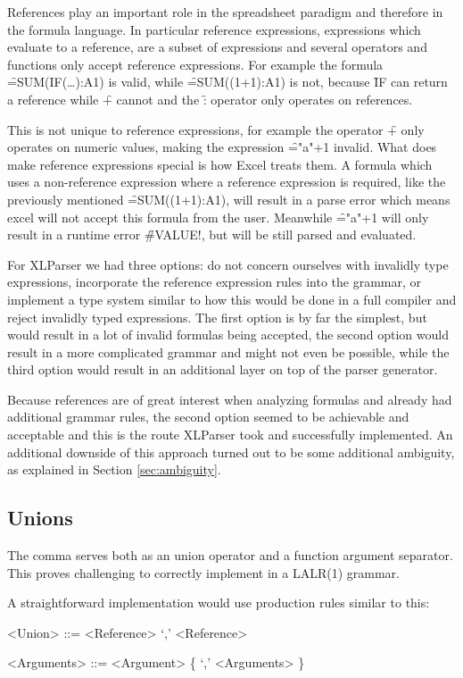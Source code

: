 References play an important role in the spreadsheet paradigm and therefore in the formula language.
In particular reference expressions, expressions which evaluate to a reference, are a subset of expressions and several operators and functions only accept reference expressions.
For example the formula \f{=SUM(IF(\ldots):A1)} is valid, while \f{=SUM((1+1):A1)} is not, because \f{IF} can return a reference while \f{+} cannot and the \f{:} operator only operates on references.

This is not unique to reference expressions, for example the operator \f{+} only operates on numeric values, making the expression \f{="a"+1} invalid.
What does make reference expressions special is how Excel treats them.
A formula which uses a non-reference expression where a reference expression is required, like the previously mentioned \f{=SUM((1+1):A1)}, will result in a parse error which means excel will not accept this formula from the user.
Meanwhile \f{="a"+1} will only result in a runtime error \f{\#VALUE!}, but will be still parsed and evaluated.

For XLParser we had three options: do not concern ourselves with invalidly type expressions, incorporate the reference expression rules into the grammar, or implement a type system similar to how this would be done in a full compiler and reject invalidly typed expressions.
The first option is by far the simplest, but would result in a lot of invalid formulas being accepted, the second option would result in a more complicated grammar and might not even be possible, while the third option would result in an additional layer on top of the parser generator.

Because references are of great interest when analyzing formulas and already had additional grammar rules, the second option seemed to be achievable and acceptable and this is the route XLParser took and successfully implemented.
An additional downside of this approach turned out to be some additional ambiguity, as explained in Section \ref{sec:ambiguity}.

\subsection{Unions}
\label{subsec:desing:unions}

The comma serves both as an union operator and a function argument separator.
This proves challenging to correctly implement in a LALR(1) grammar.

A straightforward implementation would use production rules similar to this:
\begin{grammar}
<Union> ::= <Reference> `,' <Reference>

<Arguments> ::= <Argument> \{ `,' <Arguments> \}
\end{grammar}

